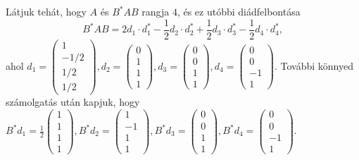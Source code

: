 \documentclass[a4paper, showtrims]{memoir}
\theoremstyle{plain}
\theoremstyle{remark}
\theoremstyle{definition}
\begin{document}
Látjuk tehát, hogy $A$ és $B^\ast AB$ rangja $4$, és ez utóbbi diádfelbontása
\[
    B^\ast AB=
    2d_1\cdot d_1^\ast
    -\frac{1}{2}d_2\cdot d_2^\ast+
    \frac{1}{2}d_3\cdot d_3^\ast
    -\frac{1}{2}d_4\cdot d_4^\ast,
\]
ahol 
$
d_1=
\begin{pmatrix}
    1\\ -1/2\\ 1/2\\ 1/2
\end{pmatrix}
,
d_2=
\begin{pmatrix}
    0\\ 1\\1\\1
\end{pmatrix}
,
d_3=
\begin{pmatrix}
    0\\ 0\\1\\1
\end{pmatrix}
,
d_4=
\begin{pmatrix}
    0\\ 0\\-1\\1
\end{pmatrix}.
$
További könnyed számolgatás után kapjuk, hogy
\(
B^\ast d_1=
\frac{1}{2}
\begin{pmatrix}
    1\\1\\1\\1
\end{pmatrix}
,
B^\ast d_2=
\begin{pmatrix}
    1\\-1\\1\\1
\end{pmatrix}
,
B^\ast d_3=
\begin{pmatrix}
    0\\0\\1\\1
\end{pmatrix}
,
B^\ast d_4=
\begin{pmatrix}
    0\\0\\-1\\1
\end{pmatrix}.
\)
\end{document}
